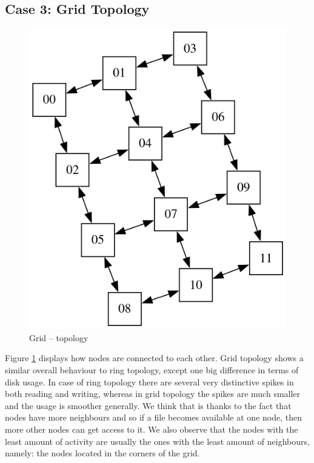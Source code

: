 \newpage
\subsection{Case 3: Grid Topology}

\begin{figure}
\centering
\captionsetup{justification=centering,width=0.6\linewidth}
\includegraphics[width=0.55\linewidth]{figures/topologies/grid.png}
\caption{Grid -- topology}
\label{fig:grid-topology}
\end{figure}

Figure \ref{fig:grid-topology} displays how nodes are connected to each other.
Grid topology shows a similar overall behaviour to ring topology, except one
big difference in terms of disk usage. In case of ring topology there are
several very distinctive spikes in both reading and writing, whereas in grid
topology the spikes are much smaller and the usage is smoother generally. We
think that is thanks to the fact that nodes have more neighbours and so if a
file becomes available at one node, then more other nodes can get access to it.
We also observe that the nodes with the least amount of activity are usually
the ones with the least amount of neighbours, namely: the nodes located in the
corners of the grid.
\newline


